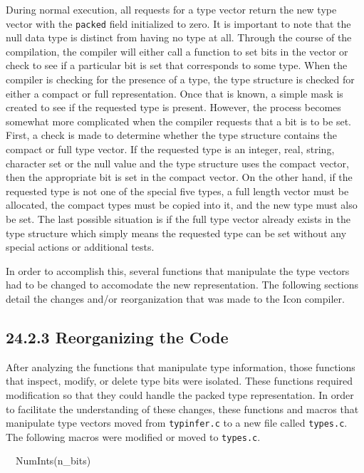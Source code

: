 During normal execution, all requests for a type vector return the new
type vector with the \texttt{packed} field initialized to zero. It
is important to note that the null data type is distinct from having
no type at all. Through the course of the compilation, the compiler
will either call a function to set bits in the vector or check to see
if a particular bit is set that corresponds to some type. When the
compiler is checking for the presence of a type, the type structure is
checked for either a compact or full representation. Once that is
known, a simple mask is created to see if the requested type is
present. However, the process becomes somewhat more complicated when
the compiler requests that a bit is to be set. First, a check is
made to determine whether the type structure contains the compact or
full type vector. If the requested type is an integer, real, string,
character set or the null value and the type structure uses the
compact vector, then the appropriate bit is set in the compact
vector. On the other hand, if the requested type is not one of the
special five types, a full length vector must be allocated, the
compact types must be copied into it, and the new type must also be
set. The last possible situation is if the full type vector already
exists in the type structure which simply means the requested type can
be set without any special actions or additional tests.

In order to accomplish this, several functions that manipulate the
type vectors had to be changed to accomodate the new representation.
The following sections detail the changes and/or reorganization that
was made to the Icon compiler.

\subsection[24.2.3 Reorganizing the Code]{24.2.3 Reorganizing the Code}

After analyzing the functions that manipulate type information, those
functions that inspect, modify, or delete type bits were
isolated. These functions required modification so that they could
handle the packed type representation. In order to facilitate the
understanding of these changes, these functions and macros that
manipulate type vectors moved from \texttt{typinfer.c} to a new file
called \texttt{types.c}. The following macros were modified or moved
to \texttt{types.c}.

{\ttfamily\mdseries
\ \ NumInts(n\_bits)}

